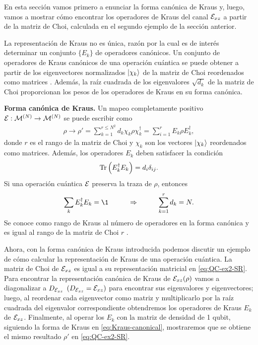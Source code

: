 En esta sección vamos primero a enunciar la forma canónica
de Kraus y, luego, vamos a mostrar cómo encontrar los 
operadores de Kraus del canal $\mathcal{E}_{xz}$ a partir de la 
matriz de Choi, calculada en el segundo ejemplo de la 
sección anterior.


La representación de Kraus no es única, razón por la cual es de interés
determinar un conjunto $\{E_k\}$ de operadores canónicos.
Un conjunto de operadores de Kraus canónicos de una 
operación cuántica se puede obtener a partir de los 
eigenvectores normalizados $\ket{\chi_k}$ de la 
matriz de Choi reordenados como matrices \cite{bengtsson_zyczkowski_2017}.
Además, la raíz cuadrada de los eigenvalores $\sqrt{d_k}$ de la 
matriz de Choi proporcionan los pesos de los operadores
de Kraus en su forma canónica.  

\textbf{Forma canónica de Kraus.} Un mapeo completamente 
positivo $\mathcal{E}:\mathcal{M}^{(N)}\to\mathcal{M}^{(N)}$ se
puede escribir como
\begin{align}
\rho \longrightarrow \rho' = 
\sum_{k=1}^{r\leq N^2}d_k\chi_k\rho\chi_k^{\dagger}
= \sum_{i=1}^rE_k\rho E_k^{\dagger},
\label{eq:Kraus-canonical}
\end{align}
donde $r$ es el rango de la matriz de Choi y $\chi_k$ 
son los vectores $\ket{\chi_k}$ reordenados como matrices.
Además, los operadores $E_k$ deben satisfacer la condición
\begin{align}
  \Tr\qty(E_k^{\dagger}E_k)=d_i\delta_{ij}.
  \label{eq:Tr-Kraus-canonical}
\end{align}
Si una operación cuántica $\mathcal{E}$ preserva la traza de $\rho$, entonces
\begin{align}
  \sum_kE_k^{\dagger}E_k=\1
  \hspace{1cm}\Rightarrow\hspace{1cm}
  \sum_{k=1}^rd_k=N .
  \label{eq:completeness-Kraus-canonical}
\end{align}
Se conoce como rango de Kraus al número de operadores 
en la forma canónica y es igual al rango de la matriz de Choi $r$
\cite{bengtsson_zyczkowski_2017}.

Ahora, con la forma canónica de Kraus introducida podemos
discutir un ejemplo de cómo calcular la representación de Kraus
de una operación cuántica.
La matriz de Choi de $\mathcal{E}_{xz}$ es igual a  su representación
matricial en \eqref{eq:QC-ex2-SR}.
Para encontrar la representación canónica de Kraus de $\mathcal{E}_{xz}\qty(\rho)$
vamos a diagonalizar a $D_{\mathcal{E}_{xz}}$ $(D_{\mathcal{E}_{xz}}=\mathcal{E}_{xz})$
para encontrar
sus eigenvalores y eigenvectores; luego, al reordenar
cada eigenvector como matriz y multiplicarlo por la raíz cuadrada
del eigenvalor correspondiente obtendremos los operadores 
de Kraus $E_k$ de $\mathcal{E}_{xz}$. Finalmente, al operar los $E_k$ 
con la matriz de densidad de 1 qubit, siguiendo la forma de 
Kraus en \eqref{eq:Kraus-canonical}, mostraremos que se obtiene el 
mismo resultado $\rho'$ en \eqref{eq:QC-ex2-SR}.

